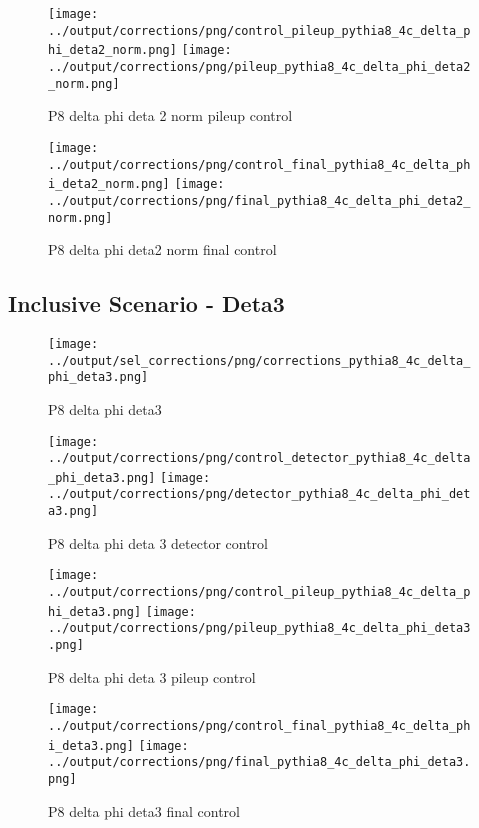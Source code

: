 \documentclass[11pt]{book}
\begin{document}
\begin{figure}[ht]
\centering
\texttt{[image: ../output/corrections/png/control\_pileup\_pythia8\_4c\_delta\_phi\_deta2\_norm.png]}
\texttt{[image: ../output/corrections/png/pileup\_pythia8\_4c\_delta\_phi\_deta2\_norm.png]}
\caption{P8 delta phi deta 2 norm pileup control}
\label{fig:p8_delta_phi_deta2_norm_pileup_control}
\end{figure}


\begin{figure}[ht]
\centering
\texttt{[image: ../output/corrections/png/control\_final\_pythia8\_4c\_delta\_phi\_deta2\_norm.png]}
\texttt{[image: ../output/corrections/png/final\_pythia8\_4c\_delta\_phi\_deta2\_norm.png]}
\caption{P8 delta phi deta2 norm final control}
\label{fig:p8_delta_phi_deta2_norm_final_control}
\end{figure}

\clearpage
\subsection{Inclusive Scenario - Deta3}
\begin{figure}[ht]
\centering
\texttt{[image: ../output/sel\_corrections/png/corrections\_pythia8\_4c\_delta\_phi\_deta3.png]}
\caption{P8 delta phi deta3}
\label{fig:p8_delta_phi_deta3}
\end{figure}


\begin{figure}[ht]
\centering
\texttt{[image: ../output/corrections/png/control\_detector\_pythia8\_4c\_delta\_phi\_deta3.png]}
\texttt{[image: ../output/corrections/png/detector\_pythia8\_4c\_delta\_phi\_deta3.png]}
\caption{P8 delta phi deta 3 detector control}
\label{fig:p8_delta_phi_deta3_detector_control}
\end{figure}

\begin{figure}[ht]
\centering
\texttt{[image: ../output/corrections/png/control\_pileup\_pythia8\_4c\_delta\_phi\_deta3.png]}
\texttt{[image: ../output/corrections/png/pileup\_pythia8\_4c\_delta\_phi\_deta3.png]}
\caption{P8 delta phi deta 3 pileup control}
\label{fig:p8_delta_phi_deta3_pileup_control}
\end{figure}


\begin{figure}[ht]
\centering
\texttt{[image: ../output/corrections/png/control\_final\_pythia8\_4c\_delta\_phi\_deta3.png]}
\texttt{[image: ../output/corrections/png/final\_pythia8\_4c\_delta\_phi\_deta3.png]}
\caption{P8 delta phi deta3 final control}
\label{fig:p8_delta_phi_deta3_final_control}
\end{figure}
\end{document}
